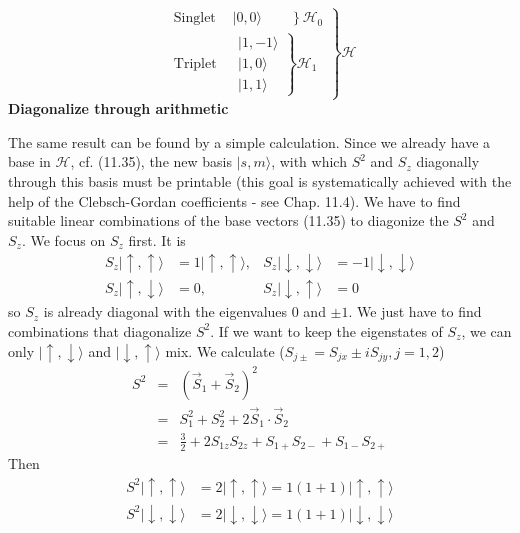 \begin{equation}
\left.
\begin{array}{rl}
\text { Singlet } & \left.|0,0\rangle\qquad \right\}\mathcal{H}_0 \\ 
\text { Triplet } & \left.\begin{array}{l}
    |1,-1\rangle \\ 
    |1,0\rangle \\
    |1,1\rangle
    \end{array}\right\}\mathcal{H}_{1}
\end{array}
\right\}
\mathcal{H}
\end{equation}
\textbf{Diagonalize through arithmetic}\par
The same result can be found by a simple calculation. Since we already have a base in $\mathcal{H}$, cf. (11.35), the new basis $| s,m\rangle$, with which $S^2$ and $S_z$ diagonally through this basis must be printable (this goal is systematically achieved with the help of the Clebsch-Gordan coefficients - see Chap. 11.4). We have to find suitable linear combinations of the base vectors (11.35) to diagonize the $S^2$ and $S_z$. We focus on $S_z$ first. It is
\begin{equation}
\begin{aligned} 
S_{z}|\uparrow, \uparrow\rangle &= 1|\uparrow, \uparrow\rangle, & S_{z}|\downarrow, \downarrow\rangle &=- 1|\downarrow, \downarrow\rangle \\ 
S_{z}|\uparrow, \downarrow\rangle &= 0, & S_{z}|\downarrow, \uparrow\rangle &= 0 \end{aligned}
\end{equation}
so $S_z$ is already diagonal with the eigenvalues ​​0 and $\pm 1$. We just have to find combinations that diagonalize $S^2$. If we want to keep the eigenstates of $S_z$, we can only $|\uparrow,\downarrow\rangle$ and $|\downarrow,\uparrow\rangle$ mix. We calculate ($S_{j \pm}=S_{j x} \pm i S_{j y}, j=1,2$)
\begin{equation}
\begin{array}{rcl}
S^2&=&(\vec{S}_1+\vec{S}_2)^2\\
&=&S_{1}^{2}+S_{2}^{2}+2 \vec{S}_{1} \cdot \vec{S}_{2} \\ 
&=&\frac{3}{2}+2 S_{1 z} S_{2 z}+S_{1+} S_{2-}+S_{1-} S_{2+}\end{array}
\end{equation}
Then
\begin{equation}
\begin{aligned} S^{2}|\uparrow, \uparrow\rangle &= 2|\uparrow, \uparrow\rangle= 1(1+1)|\uparrow, \uparrow\rangle \\ S^{2}|\downarrow, \downarrow\rangle &= 2|\downarrow, \downarrow\rangle= 1(1+1)|\downarrow, \downarrow\rangle \end{aligned}
\end{equation}
